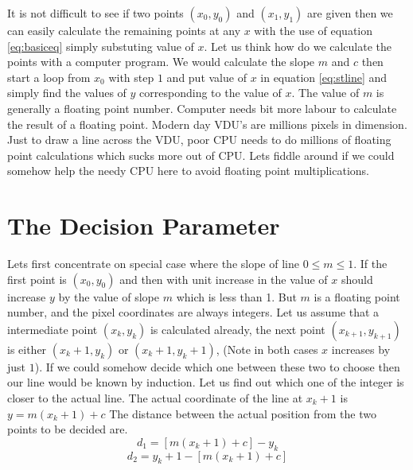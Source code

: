 \documentclass[a4paper,12pt,oneside]{book}
\begin{document}
It is not difficult to see if two points  $(x_0,y_0)$ and $(x_1,y_1)$ are given then we can easily calculate the remaining points at any $x$ with the use of equation \ref{eq:basiceq} simply substuting value of $x$.
Let us think how do we calculate the points with a computer program. We would calculate the slope $m$ and $c$ then start a loop from $x_0$  with step $1$ and put value of $x$ in equation  \ref{eq:stline}  and simply find the values of $y$ corresponding to the value of $x$. 
The value of $m$  is generally a floating point number. Computer needs bit more labour to calculate the result of a floating point. Modern day VDU's are millions pixels in dimension. Just to draw a line across the VDU, poor CPU needs to do millions of floating point calculations which sucks more out of CPU. Lets fiddle around if we could somehow help the needy CPU here to avoid floating point multiplications.\\
\section{The Decision Parameter}
Lets first concentrate on special case where the slope of line $0 \leq m \leq 1$. If the first point is  $(x_0,y_0)$  and then with unit increase in the value of $x$ should increase $y$ by the value of slope $m$ which is less than 1. But $m$ is a floating point number, and the pixel coordinates are always integers. 
Let us assume that a intermediate point  $(x_k,y_k)$ is calculated already, the next point  $(x_{k+1},y_{k+1})$ is  either  $(x_k+1,y_k)$ or  $(x_k+1,y_k+1)$, (Note in both cases $x$ increases by just $1$).  If we could somehow decide which one between these two to  choose then our line would be known by induction. 
Let us find out which one of the integer is closer to the actual line. The actual coordinate of the line at $x_k+1$  is $y=m(x_k+1)+c$ The distance between the actual position from the two points to be decided are.
\begin{equation} \label{eq:dee1}
	d_1=[m(x_k+1)+c]-y_k
\end{equation}
\begin{equation} \label{eq:dee2}
	d_2=y_k+1-[m(x_k+1)+c]
\end{equation}
\end{document}
